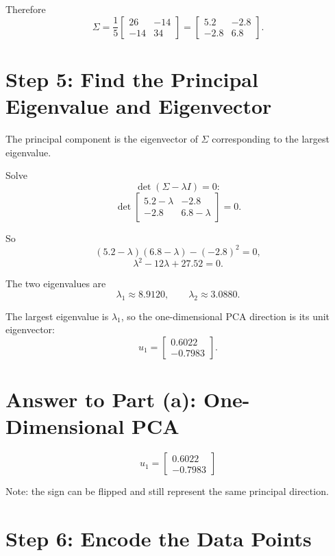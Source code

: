 \documentclass[11pt]{article}
\begin{document}
Therefore
\[
    \Sigma
    =
    \frac{1}{5}
    \begin{bmatrix}
        26 & -14\\
        -14 & 34
    \end{bmatrix}
    =
    \begin{bmatrix}
        5.2 & -2.8\\
        -2.8 & 6.8
    \end{bmatrix}.
\]

\section*{Step 5: Find the Principal Eigenvalue and Eigenvector}

The principal component is the eigenvector of \(\Sigma\) corresponding to the
largest eigenvalue.

Solve
\[
    \det(\Sigma-\lambda I)=0:
\]
\[
    \det
    \begin{bmatrix}
        5.2-\lambda & -2.8\\
        -2.8 & 6.8-\lambda
    \end{bmatrix}
    =0.
\]

So
\[
    (5.2-\lambda)(6.8-\lambda)-(-2.8)^2=0,
\]
\[
    \lambda^2-12\lambda+27.52=0.
\]

The two eigenvalues are
\[
    \lambda_1 \approx 8.9120,
    \qquad
    \lambda_2 \approx 3.0880.
\]

The largest eigenvalue is \(\lambda_1\), so the one-dimensional PCA direction is
its unit eigenvector:
\[
    u_1
    =
    \begin{bmatrix}
        0.6022\\
        -0.7983
    \end{bmatrix}.
\]

\section*{Answer to Part (a): One-Dimensional PCA}

\[
    \boxed{
    u_1=
    \begin{bmatrix}
        0.6022\\
        -0.7983
    \end{bmatrix}
    }
\]

Note: the sign can be flipped and still represent the same principal direction.

\section*{Step 6: Encode the Data Points}
\end{document}
